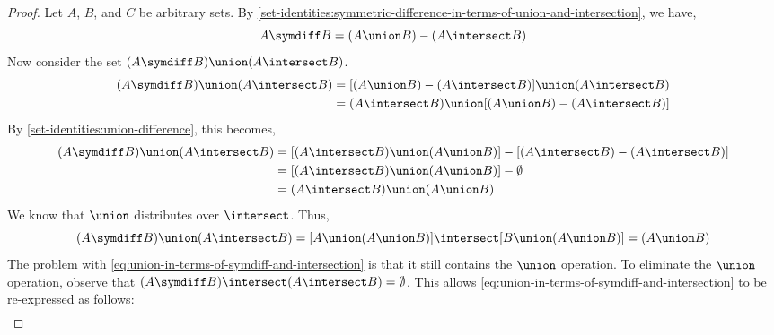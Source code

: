 \begin{proof}
    Let \( A \), \( B \), and \( C \) be arbitrary sets.
    By \cref{set-identities:symmetric-difference-in-terms-of-union-and-intersection}, we have,
    \begin{equation*}
        A \symdiff B = \mleft( A \union B \mright) - \mleft( A \intersect B \mright)
    \end{equation*}
    Now consider the set \( \mleft( A \symdiff B \mright) \union \mleft( A \intersect B \mright) \).
    \begin{align*}
        \mleft( A \symdiff B \mright) \union \mleft( A \intersect B \mright)
            &= \mleft[ \mleft( A \union B \mright) - \mleft( A \intersect B \mright) \mright] \union \mleft( A \intersect B \mright)\\
            &= \mleft( A \intersect B \mright) \union \mleft[ \mleft( A \union B \mright) - \mleft( A \intersect B \mright) \mright]
    \end{align*}
    By \cref{set-identities:union-difference}, this becomes,
    \begin{align*}
        \mleft( A \symdiff B \mright) \union \mleft( A \intersect B \mright)
        &= \mleft[ \mleft( A \intersect B \mright) \union \mleft( A \union B \mright) \mright] - \mleft[ \mleft( A \intersect B \mright) - \mleft( A \intersect B \mright) \mright]\\
        &= \mleft[ \mleft( A \intersect B \mright) \union \mleft( A \union B \mright) \mright] - \emptyset\\
        &= \mleft( A \intersect B \mright) \union \mleft( A \union B \mright)
    \end{align*}
    We know that \( \union \) distributes over \( \intersect \). Thus,
    \begin{equation}
        \label{eq:union-in-terms-of-symdiff-and-intersection}
        \mleft( A \symdiff B \mright) \union \mleft( A \intersect B \mright)
        = \mleft[ A \union \mleft( A \union B \mright) \mright] \intersect \mleft[ B \union \mleft( A \union B \mright) \mright]
        = \mleft( A \union B \mright)
    \end{equation}
    The problem with \eqref{eq:union-in-terms-of-symdiff-and-intersection} is that it still contains the \( \union \) operation. To eliminate
    the \( \union \) operation, observe that \( \mleft( A \symdiff B \mright) \intersect \mleft( A \intersect B \mright) = \emptyset \). This allows
    \eqref{eq:union-in-terms-of-symdiff-and-intersection} to be re-expressed as follows:
    \begin{align*}

\end{align*}
\end{proof}
